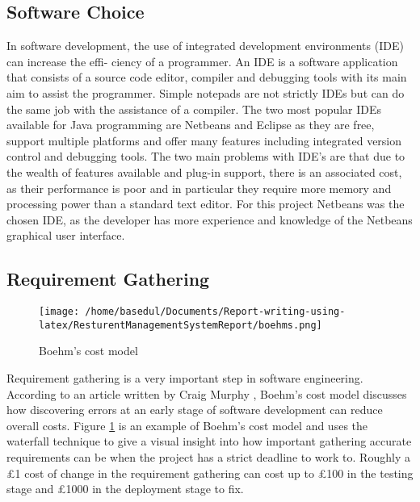 \documentclass[12pt,a4paper]{article}
\begin{document}
	\subsection{Software Choice}
		In software development, the use of integrated development environments (IDE) can increase the effi-
ciency of a programmer. An IDE is a software application that consists of a source code editor, compiler
and debugging tools with its main aim to assist the programmer. Simple notepads are not strictly IDEs
but can do the same job with the assistance of a compiler.
The two most popular IDEs available for Java programming are Netbeans and Eclipse as they
are free, support multiple platforms and offer many features including integrated version control and
debugging tools. The two main problems with IDE’s are that due to the wealth of features available
and plug-in support, there is an associated cost, as their performance is poor and in particular they
require more memory and processing power than a standard text editor.
For this project Netbeans was the chosen IDE, as the developer has more experience and knowledge
of the Netbeans graphical user interface.
\subsection{Requirement Gathering}
	\begin{figure}
		\centering
		\texttt{[image: /home/basedul/Documents/Report-writing-using-latex/ResturentManagementSystemReport/boehms.png]}
		\caption{Boehm's cost model \cite{RefWorks:1}}
		\label{fig:req} 
	\end{figure}
	Requirement gathering is a very important step in software engineering. According to an article written
by Craig Murphy \cite{RefWorks:1}, Boehm’s cost model discusses how discovering errors at an early stage of software
development can reduce overall costs. Figure \ref{fig:req} is an example of Boehm’s cost model and uses the
waterfall technique to give a visual insight into how important gathering accurate requirements can be when the project has a strict deadline to work to. Roughly a £1 cost of change in the requirement
gathering can cost up to £100 in the testing stage and £1000 in the deployment stage to fix.
\newpage
\end{document}
